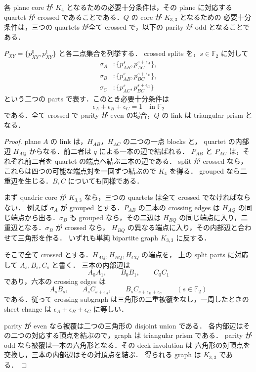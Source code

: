 \begin{proposition}
\label{q5:1112}
各 plane core が $K_4$ となるための必要十分条件は，その plane に対応する
quartet が crossed であることである．$Q$ の core が $K_{3,3}$ となるための
必要十分条件は，三つの quartets が全て crossed で，以下の parity が odd となることである．

$P_{XY}=\{p_{XY}^0,p_{XY}^1\}$ と各二点集合を列挙する．
crossed splits を，$s\in\mathbb F_2$ に対して
\begin{align*}
 \sigma_A &: \{p_{AB}^s,p_{AC}^{s+\epsilon_A}\},\\
 \sigma_B &: \{p_{AB}^s,p_{BC}^{s+\epsilon_B}\},\\
 \sigma_C &: \{p_{AC}^s,p_{BC}^{s+\epsilon_C}\}
\end{align*}
という二つの parts で表す．このとき必要十分条件は
\begin{equation}\label{q5:odd-parity}
 \epsilon_A+\epsilon_B+\epsilon_C=1\quad\text{in }\mathbb F_2
\end{equation}
である．全て crossed で parity が even の場合，$Q$ の link は triangular prism となる．
\end{proposition}

\begin{proof}
plane $A$ の link は，$H_{AB}$，$H_{AC}$ の二つの一点 blocks と，
quartet の内部辺 $H_{AQ}$ からなる．前二者は $q$ による一本の辺で結ばれる．
$P_{AB}$ と $P_{AC}$ は，それぞれ前二者を quartet の端点へ結ぶ二本の辺である．
split が crossed なら，これらは四つの可能な端点対を一回ずつ結ぶので $K_4$ を得る．
grouped なら二重辺を生じる．$B,C$ についても同様である．

まず quadric core が $K_{3,3}$ なら，三つの quartets は全て crossed でなければならない．
例えば $\sigma_A$ が grouped とする．$P_{AB}$ の二本の crossing edges は
$H_{AQ}$ の同じ端点から出る．$\sigma_B$ も grouped なら，その二辺は
$H_{BQ}$ の同じ端点に入り，二重辺となる．$\sigma_B$ が crossed なら，
$H_{BQ}$ の異なる端点に入り，その内部辺と合わせて三角形を作る．
いずれも単純 bipartite graph $K_{3,3}$ に反する．

そこで全て crossed とする．$H_{AQ},H_{BQ},H_{CQ}$ の端点を，
上の split parts に対応して $A_s,B_s,C_s$ と書く．
三本の内部辺は
\[
 A_0A_1,\qquad B_0B_1,\qquad C_0C_1
\]
であり，六本の crossing edges は
\begin{equation}\label{q5:voltage-edges}
 A_sB_s,\qquad A_sC_{s+\epsilon_A},\qquad
 B_sC_{s+\epsilon_B+\epsilon_C}
 \qquad(s\in\mathbb F_2)
\end{equation}
である．従って crossing subgraph は三角形の二重被覆をなし，一周したときの
sheet change は $\epsilon_A+\epsilon_B+\epsilon_C$ に等しい．

parity が even なら被覆は二つの三角形の disjoint union である．
各内部辺はその二つの対応する頂点を結ぶので，graph は triangular prism である．
parity が odd なら被覆は一本の六角形となる．その deck involution は
六角形の対頂点を交換し，三本の内部辺はその対頂点を結ぶ．
得られる graph は $K_{3,3}$ である．
\end{proof}

